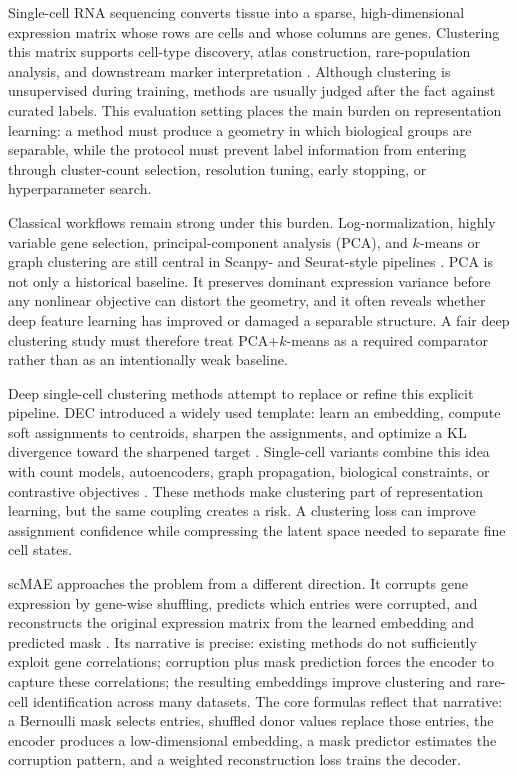 \documentclass[11pt]{article}
\begin{document}
Single-cell RNA sequencing converts tissue into a sparse, high-dimensional expression matrix whose rows are cells and whose columns are genes. Clustering this matrix supports cell-type discovery, atlas construction, rare-population analysis, and downstream marker interpretation \citep{kiselev2019challenges}. Although clustering is unsupervised during training, methods are usually judged after the fact against curated labels. This evaluation setting places the main burden on representation learning: a method must produce a geometry in which biological groups are separable, while the protocol must prevent label information from entering through cluster-count selection, resolution tuning, early stopping, or hyperparameter search.

Classical workflows remain strong under this burden. Log-normalization, highly variable gene selection, principal-component analysis (PCA), and $k$-means or graph clustering are still central in Scanpy- and Seurat-style pipelines \citep{wolf2018scanpy,stuart2019seurat}. PCA is not only a historical baseline. It preserves dominant expression variance before any nonlinear objective can distort the geometry, and it often reveals whether deep feature learning has improved or damaged a separable structure. A fair deep clustering study must therefore treat PCA+$k$-means as a required comparator rather than as an intentionally weak baseline.

Deep single-cell clustering methods attempt to replace or refine this explicit pipeline. DEC introduced a widely used template: learn an embedding, compute soft assignments to centroids, sharpen the assignments, and optimize a KL divergence toward the sharpened target \citep{xie2016dec}. Single-cell variants combine this idea with count models, autoencoders, graph propagation, biological constraints, or contrastive objectives \citep{tian2019scdeepcluster,li2020desc,tian2021scdcc,wang2021scgnn,gan2022scdsc,wan2022scname,xu2024sccdcg}. These methods make clustering part of representation learning, but the same coupling creates a risk. A clustering loss can improve assignment confidence while compressing the latent space needed to separate fine cell states.

scMAE approaches the problem from a different direction. It corrupts gene expression by gene-wise shuffling, predicts which entries were corrupted, and reconstructs the original expression matrix from the learned embedding and predicted mask \citep{fang2024scmae}. Its narrative is precise: existing methods do not sufficiently exploit gene correlations; corruption plus mask prediction forces the encoder to capture these correlations; the resulting embeddings improve clustering and rare-cell identification across many datasets. The core formulas reflect that narrative: a Bernoulli mask selects entries, shuffled donor values replace those entries, the encoder produces a low-dimensional embedding, a mask predictor estimates the corruption pattern, and a weighted reconstruction loss trains the decoder.
\end{document}
